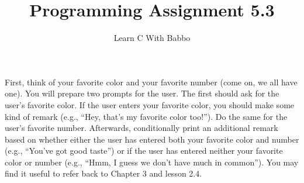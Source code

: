\documentclass{article}
\begin{document}
\title{Programming Assignment 5.3}
\author{Learn C With Babbo}
\date{}
\maketitle
First, think of your favorite color and your favorite number (come on, we all have one). You will prepare two
prompts for the user. The first should ask for the user's favorite color. If the user enters your favorite color,
you should make some kind of remark (e.g., ``Hey, that's my favorite color too!''). Do the same for the user's 
favorite number. Afterwards, conditionally print an additional remark based on whether either the user has entered both 
your favorite color and number (e.g., ``You've got good taste'') or if the user has entered neither your favorite 
color or number (e.g., ``Hmm, I guess we don't have much in common''). You may find it useful to refer back to 
Chapter 3 and lesson 2.4.
\end{document}
